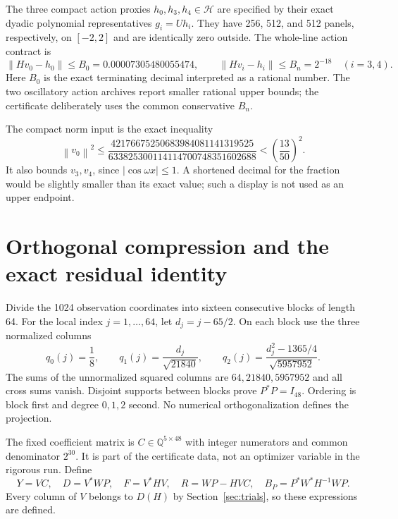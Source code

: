 \documentclass[11pt,a4paper]{article}
\numberwithin{equation}{section}
\theoremstyle{definition}\newtheorem{definition}[theorem]{Definition}
\theoremstyle{remark}\newtheorem{remark}[theorem]{Remark}
\newcommand{\HH}{\mathcal H}
\newcommand{\Q}{\mathbb Q}
\newcommand{\norm}[1]{\left\|#1\right\|}
\begin{document}
The three compact action proxies $h_0,h_3,h_4\in\HH$ are specified by their exact dyadic polynomial representatives $g_i=Uh_i$. They have 256, 512, and 512 panels, respectively, on $[-2,2]$ and are identically zero outside. The whole-line action contract is
\begin{equation}\label{eq:actionerrors}
 \norm{Hv_0-h_0}\le B_0=0.00007305480055474,\qquad
 \norm{Hv_i-h_i}\le B_n=2^{-18}\quad(i=3,4).
\end{equation}
Here $B_0$ is the exact terminating decimal interpreted as a rational number. The two oscillatory action archives report smaller rational upper bounds; the certificate deliberately uses the common conservative $B_n$.

The compact norm input is the exact inequality
\begin{equation}\label{eq:norminput}
 \norm{v_0}^2\le
 \frac{42176675250683984081141319525}{633825300114114700748351602688}
 <\left(\frac{13}{50}\right)^2.
\end{equation}
It also bounds $v_3,v_4$, since $|\cos\omega x|\le1$. A shortened decimal for the fraction would be slightly smaller than its exact value; such a display is not used as an upper endpoint.

\section{Orthogonal compression and the exact residual identity}\label{sec:residual}
Divide the 1024 observation coordinates into sixteen consecutive blocks of length 64. For the local index $j=1,\ldots,64$, let $d_j=j-65/2$. On each block use the three normalized columns
\begin{equation}\label{eq:P}
 q_0(j)=\frac18,\qquad
 q_1(j)=\frac{d_j}{\sqrt{21840}},\qquad
 q_2(j)=\frac{d_j^2-1365/4}{\sqrt{5957952}}.
\end{equation}
The sums of the unnormalized squared columns are $64,21840,5957952$ and all cross sums vanish. Disjoint supports between blocks prove $P^*P=I_{48}$. Ordering is block first and degree $0,1,2$ second. No numerical orthogonalization defines the projection.

The fixed coefficient matrix is $C\in\Q^{5\times48}$ with integer numerators and common denominator $2^{30}$. It is part of the certificate data, not an optimizer variable in the rigorous run. Define
\begin{equation}\label{eq:DFR}
 Y=VC,\quad D=V^*WP,\quad F=V^*HV,\quad
 R=WP-HVC,\quad B_P=P^*W^*H^{-1}WP.
\end{equation}
Every column of $V$ belongs to $D(H)$ by Section~\ref{sec:trials}, so these expressions are defined.
\end{document}

